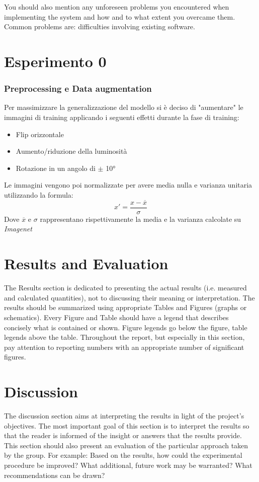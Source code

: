 You should also mention any unforeseen problems you encountered when implementing the
system and how and to what extent you overcame them. Common problems are:
 difficulties involving existing software.

\section{Esperimento 0}
\subsubsection{Preprocessing e Data augmentation}
Per massimizzare la generalizzazione del modello si è deciso di "aumentare" le immagini di training applicando i seguenti effetti durante la fase di training:
\begin{itemize}
\item Flip orizzontale
\item Aumento/riduzione della luminosità 
\item Rotazione in un angolo di $\pm$ 10°
\end{itemize}
Le immagini vengono poi normalizzate per avere media nulla e varianza unitaria utilizzando la formula:
\begin{equation}
x' = \frac{x - \overline{x}}{\sigma}
\end{equation}
Dove $ \overline{x} $ e $ \sigma $ rappresentano rispettivamente la media e la varianza calcolate su \textit{Imagenet}
\section{Results and Evaluation}
The Results section is dedicated to presenting the actual results (i.e. measured and calculated quantities), not to discussing their meaning or interpretation. The results should be summarized using appropriate Tables and Figures (graphs or schematics). Every Figure and Table should have a legend that describes concisely what is contained or shown. Figure legends go below the figure, table legends above the table. Throughout the report, but especially in this section, pay attention to reporting numbers with an appropriate number of significant figures. 

\section{Discussion}
The discussion section aims at interpreting the results in light of the project's objectives. The most important goal of this section is to interpret the results so that the reader is informed of the insight or answers that the results provide. This section should also present an evaluation of the particular approach taken by the group. For example: Based on the results, how could the experimental procedure be improved? What additional, future work may be warranted? What recommendations can be drawn?


